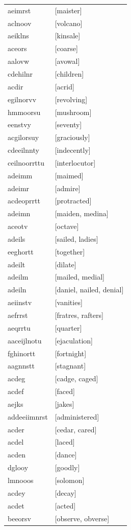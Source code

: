 \documentclass{article}
\begin{document}
\begin{tabular}{ll}
aeimrst & [maister] \\
aclnoov & [volcano] \\
aeiklns & [kinsale] \\
aceors & [coarse] \\
aalovw & [avowal] \\
cdehilnr & [children] \\
acdir & [acrid] \\
egilnorvv & [revolving] \\
hmmoorsu & [mushroom] \\
eenstvy & [seventy] \\
acgilorsuy & [graciously] \\
cdeeilnnty & [indecently] \\
ceilnoorrttu & [interlocutor] \\
adeimm & [maimed] \\
adeimr & [admire] \\
acdeoprrtt & [protracted] \\
adeimn & [maiden, medina] \\
aceotv & [octave] \\
adeils & [sailed, ladies] \\
eeghortt & [together] \\
adeilt & [dilate] \\
adeilm & [mailed, medial] \\
adeiln & [daniel, nailed, denial] \\
aeiinstv & [vanities] \\
aefrrst & [fratres, rafters] \\
aeqrrtu & [quarter] \\
aaceijlnotu & [ejaculation] \\
fghinortt & [fortnight] \\
aagnnstt & [stagnant] \\
acdeg & [cadge, caged] \\
acdef & [faced] \\
aejks & [jakes] \\
addeeiimnrst & [administered] \\
acder & [cedar, cared] \\
acdel & [laced] \\
acden & [dance] \\
dglooy & [goodly] \\
lmnooos & [solomon] \\
acdey & [decay] \\
acdet & [acted] \\
beeorsv & [observe, obverse] \\

\end{tabular}
\end{document}
